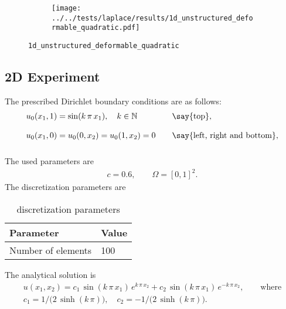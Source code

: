 %
%
\begin{frame}{}
  \vspace*{-0.2cm}
  \begin{figure}[h!]
    \begin{subfigure}[t]{0.48\textwidth}%
      \centering%
      \texttt{[image: ../../tests/laplace/results/1d\_unstructured\_deformable\_quadratic.pdf]}%
    \end{subfigure}%
    \caption{\lstinline{1d_unstructured_deformable_quadratic}}
  \end{figure} 
\end{frame}
%
%
\begin{frame}{}
\subsection{2D Experiment}
%
The prescribed Dirichlet boundary conditions are as follows:
\begin{equation*}
  \begin{array}{lll}
    u_0(x_1,1) = \sin(k\,\pi\,x_1), \quad k \in \N  \qquad &\text{\say{top}},\\[4mm]
    u_0(x_1,0) = u_0(0,x_2) = u_0(1,x_2) = 0  \quad &\text{\say{left, right and bottom}},\\[4mm]
  \end{array}
\end{equation*}
%
The used parameters are
\begin{equation*}
  \begin{array}{lll}
    c = 0.6,\qquad \Omega = [0,1]^2.
  \end{array}
\end{equation*}
%
The discretization parameters are
\begin{table}[h!]
  \begin{center}
    \begin{tabular}{l|l}
      \textbf{Parameter} & \textbf{Value}\\
      \hline
      Number of elements & 100\\
    \end{tabular}
  \end{center}
  \caption{discretization parameters}
  \label{tab:table1}
\end{table}
%
The analytical solution is
\begin{equation*}
  \begin{array}{lll}
    u(x_1,x_2) = c_1\,\sin(k\,\pi\,x_1)\,e^{k\,\pi\,x_2} + c_2\,\sin(k\,\pi\,x_1)\,e^{-k\,\pi\,x_2}, \qquad \text{where}\\[4mm]
    c_1 = 1/\big(2\,\sinh(k\,\pi)\big), \quad c_2=-1/\big(2\,\sinh(k\,\pi)\big).
  \end{array}
\end{equation*}
\end{frame}
